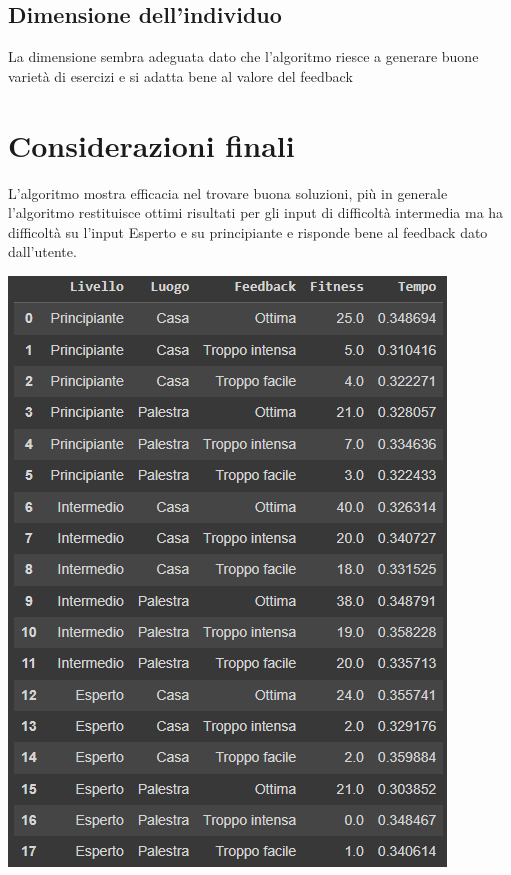 \documentclass{book}
\begin{document}
   \subsection{Dimensione dell'individuo}
   La dimensione sembra adeguata dato che l'algoritmo riesce a generare buone varietà di esercizi e si adatta bene al valore del feedback

   \section{Considerazioni finali}
    L'algoritmo mostra efficacia nel trovare buona soluzioni, più in generale l'algoritmo restituisce ottimi risultati per gli input di difficoltà intermedia ma ha difficoltà su l'input Esperto e su principiante e risponde bene al feedback dato dall'utente.\newline
    
    \includegraphics[width=1.0\linewidth]{test.png} 
\newpage
\end{document}
